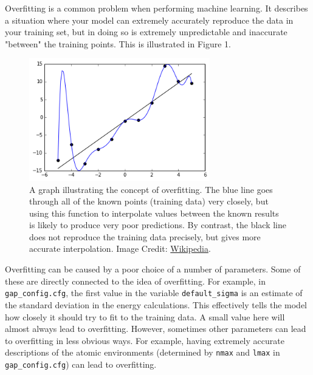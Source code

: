 \documentclass{article}
\begin{document}

Overfitting is a common problem when performing machine learning. It describes a situation where your model can extremely accurately reproduce the data in your training set, but in doing so is extremely unpredictable and inaccurate "between" the training points. This is illustrated in Figure 1.

\begin{figure}[t]

\centering

\includegraphics[width=0.7\textwidth]{Overfitted_Data.png}
\caption{A graph illustrating the concept of overfitting. The blue line goes through all of the known points (training data) very closely, but using this function to interpolate values between the known results is likely to produce very poor predictions. By contrast, the black line does not reproduce the training data precisely, but gives more accurate interpolation. Image Credit: \href{https://en.wikipedia.org/wiki/Overfitting}{Wikipedia}.}

\end{figure}

Overfitting can be caused by a poor choice of a number of parameters. Some of these are directly connected to the idea of overfitting. For example, in \verb|gap_config.cfg|, the first value in the variable \verb|default_sigma| is an estimate of the standard deviation in the energy calculations. This effectively tells the model how closely it should try to fit to the training data. A small value here will almost always lead to overfitting. However, sometimes other parameters can lead to overfitting in less obvious ways. For example, having extremely accurate descriptions of the atomic environments (determined by \verb|nmax| and \verb|lmax| in \verb|gap_config.cfg|) can lead to overfitting.
\end{document}

